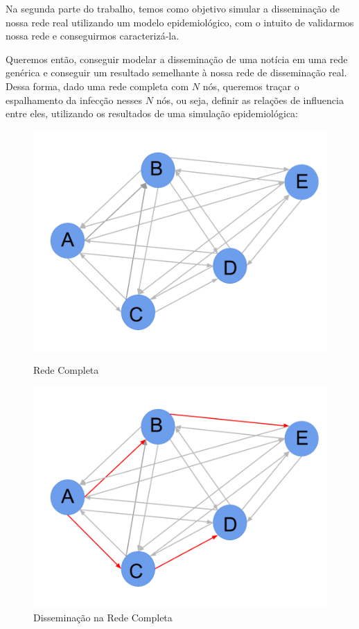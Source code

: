 \documentclass[a4paper,12pt]{article}
\begin{document}
Na segunda parte do trabalho, temos como objetivo simular a disseminação de nossa rede real utilizando um modelo epidemiológico, com o intuito
de validarmos nossa rede e conseguirmos caracterizá-la.

Queremos então, conseguir modelar a disseminação de uma notícia em uma rede genérica e conseguir um resultado semelhante à nossa rede de
disseminação real. Dessa forma, dado uma rede completa com $N$ nós, queremos traçar o espalhamento da infecção nesses $N$ nós, ou seja, definir
as relações de influencia entre eles, utilizando os resultados de uma simulação epidemiológica:
\vspace{0.4cm}

\begin{figure}[ht]
\centering
\begin{minipage}{.5\textwidth}
  \centering
  \includegraphics[width=.9\linewidth]{./rede3.png}
  \caption{Rede Completa}
  \label{fig:test1}
\end{minipage}%
\begin{minipage}{.5\textwidth}
  \centering
  \includegraphics[width=.9\linewidth]{./rede4.png}
  \caption{Disseminação na Rede Completa}
  \label{fig:test2}
\end{minipage}
\end{figure}
\end{document}
